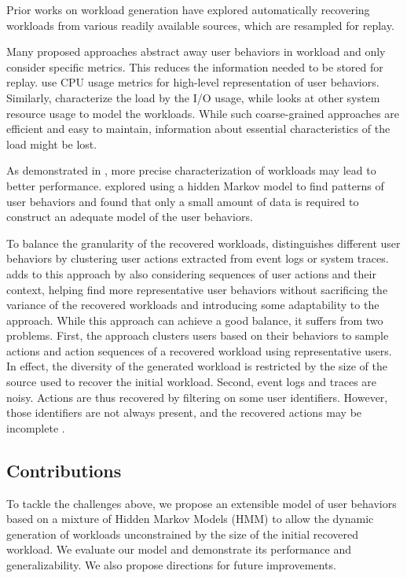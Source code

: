 Prior works on workload generation have explored automatically recovering workloads from various readily available sources, which are resampled for replay.

Many proposed approaches abstract away user behaviors in workload and only consider specific metrics. This reduces the information needed to be stored for replay. \cite{Shang2015-gj, Cohen2005-mn} use CPU usage metrics for high-level representation of user behaviors. Similarly, \cite{Haghdoost2017-bc, Yadwadkar2010-ml, Busch2015-yo, Seo2014-xv} characterize the load by the I/O usage, while \cite{Cortez2017-nc} looks at other system resource usage to model the workloads. While such coarse-grained approaches are efficient and easy to maintain, information about essential characteristics of the load might be lost.

As demonstrated in \cite{Cohen2005-mn}, more precise characterization of workloads may lead to better performance. \cite{Yadwadkar2010-ml} explored using a hidden Markov model to find patterns of user behaviors and found that only a small amount of data is required to construct an adequate model of the user behaviors.

To balance the granularity of the recovered workloads, \cite{Syer2017-ek, Vogele2018-zz, Summers2016-jj, Xi2011-ki, Hassan2008-nj} distinguishes different user behaviors by clustering user actions extracted from event logs or system traces. \cite{Chen2019-fu} adds to this approach by also considering sequences of user actions and their context, helping find more representative user behaviors without sacrificing the variance of the recovered workloads and introducing some adaptability to the approach. While this approach can achieve a good balance, it suffers from two problems. First, the approach clusters users based on their behaviors to sample actions and action sequences of a recovered workload using representative users. In effect, the diversity of the generated workload is restricted by the size of the source used to recover the initial workload. Second, event logs and traces are noisy. Actions are thus recovered by filtering on some user identifiers. However, those identifiers are not always present, and the recovered actions may be incomplete \cite{Zhao2023-nh}.

\subsection{Contributions}

To tackle the challenges above, we propose an extensible model of user behaviors based on a mixture of Hidden Markov Models (HMM) to allow the dynamic generation of workloads unconstrained by the size of the initial recovered workload. We evaluate our model and demonstrate its performance and generalizability. We also propose directions for future improvements.

